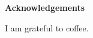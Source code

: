 \thispagestyle{empty}

\begin{center}
    {\LARGE\bf Acknowledgements}
\end{center}

I am grateful to coffee.
